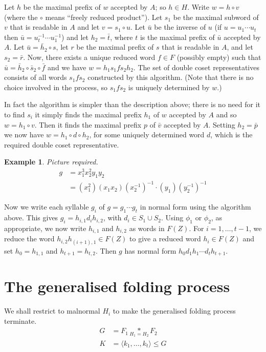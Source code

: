 \documentclass[a4paper,12pt]{article}
\newtheorem{exam}[theorem]{Example}
\newenvironment{example}{\begin{exam} \rm}{\end{exam}}
\numberwithin{equation}{section}
\numberwithin{figure}{section}
\begin{document}
Let $h$ be the maximal prefix of $w$ accepted by $A$; so $h\in H$.
Write $w=h\circ v$ (where the $\circ$ means ``freely reduced product''). 
Let $s_1$ be the maximal subword of $v$ that is readable in $A$ and let $v=s_1\circ u$. 
Let $\bar u$ be the inverse of $u$ (if $u=u_1\cdots u_t$ then $\bar u=
u_t^{-1}\cdots u_1^{-1}$) and let $h_2=\bar t$, 
where $t$ is the maximal prefix 
of $\bar u$ accepted by $A$. Let $\bar u= \bar h_2 \circ s$, let $r$ be the maximal prefix
of $s$ that is readable in $A$, and let $s_2=\bar r$. Now, there exists 
a unique reduced word $f\in F$ 
(possibly empty) such that $\bar u= \bar h_2\circ \bar s_2\circ \bar f$ and we
have 
$w=h_1s_1fs_2h_2$. The set of double coset representatives consists of all words $s_1fs_2$ constructed by
this algorithm. (Note that there is no choice involved in the process, so $s_1fs_2$ is uniquely determined
by $w$.) 

In fact the algorithm is simpler than the description above; there is no need for it to find $s_i$  it 
simply finds the maximal prefix $h_1$ of $w$  accepted  by $A$  and so $w=h_1\circ v$. Then it finds the
maximal prefix $p$ of $\bar v$ accepted by $A$. Setting $h_2=\bar p$ we now have $w=h_1\circ d \circ h_2$, for
some uniquely determined word $d$, which is the required double coset representative. 


\begin{example}
Picture required.
\begin{align*} 
g &= x_1^3x_2^2y_1y_2 \\ 
&= (x_1^2)(x_1x_2)(x_2^{-1})^{-1} \cdot (y_1)(y_2^{-1})^{-1}
\end{align*}
\end{example}

Now we write each syllable $g_i$ of $g=g_1\cdots g_t$ in normal form using the algorithm above. 
This gives $g_i=h_{i,1}d_ih_{i,2}$, with $d_i\in S_1\cup S_2$. Using $\phi_1$ or $\phi_2$, as appropriate,
we now write $h_{i,1}$ and $h_{i,2}$ as words in $F(Z)$. For $i=1,\ldots , t-1$, we reduce the 
word $h_{i,2}h_{(i+1),1}\in F(Z)$ to give a reduced word $h_i\in F(Z)$ and set $h_0=h_{1,1}$ and  $h_{t+1}=h_{t,2}$.
Then $g$ has normal form $h_0d_1h_1\cdots d_th_{t+1}$. 
\section{The generalised folding process}
We shall restrict to malnormal $H_i$ to make the generalised folding process terminate.
\begin{align*} 
G &= F_1 \underset{H_1=H_2}{\ast}F_2 \\ 
K &= \langle k_1, \ldots, k_t \rangle \leqslant G
\end{align*}
%
%


\end{document}
